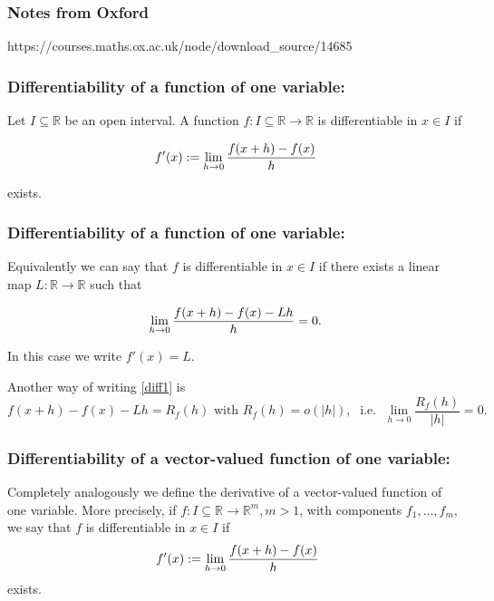  \begin{frame}[fragile] \frametitle{Notes from Oxford}
https://courses.maths.ox.ac.uk/node/download\_source/14685
\end{frame}

 \begin{frame}[fragile] \frametitle{ Differentiability of a function of one variable:}

Let $I \subseteq \mathbb{R}$ be an open interval. A function $f\colon I \subseteq \mathbb{R} \rightarrow \mathbb{R}$
is differentiable in $x \in I$ if 

  \[ f'(x):= \lim_{h \rightarrow 0} {f(x+h) - f(x) \over h}  \]
 
exists.  

\end{frame}


 \begin{frame}[fragile] \frametitle{ Differentiability of a function of one variable:}
  
  Equivalently we can say that $f$ is differentiable in  $x\in I$ if there
exists a linear map   $L\colon \mathbb{R} \rightarrow \mathbb{R}$  such that

  \begin{equation}\label{diff1}
  \lim_{h \rightarrow 0} {f(x+h) - f(x) -Lh \over h} = 0.
  \end{equation}
  
  In this case we write $f'(x)=L$.

  Another way of writing \eqref{diff1} is  
  \begin{equation} \label{diff2}
  f(x+h)-f(x) - Lh = R_f(h) \text{ with } R_f(h) = o(|h|), \; \text{ i.e. } 
  \; \lim_{h \to 0} \frac{R_f(h)}{|h|} =0.
  \end{equation}

\end{frame}

 \begin{frame}[fragile] \frametitle{ Differentiability of a vector-valued function of one variable:}

Completely analogously we define the derivative of a vector-valued function of 
one variable. More precisely,  if 
  $f\colon I \subseteq \mathbb{R} \rightarrow \mathbb{R}^m, m>1$, with components
  $f_1, \ldots, f_m$, we say that $f$ is differentiable in $x \in I$ if 
  \[ \ 
  f'(x):=\lim_{h \rightarrow 0} {f(x+h) - f(x) \over h} \]
  exists.  

 
\end{frame}

